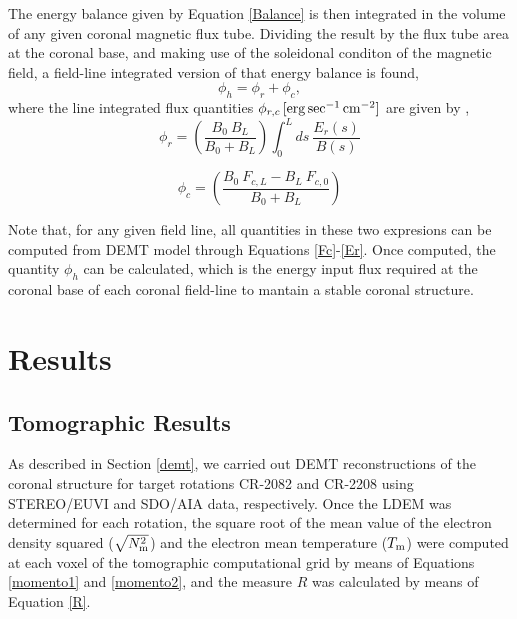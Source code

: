 \documentclass[namedreferences]{solarphysics}
\newcommand{\Tm}{T_{\rm m}}
\newcommand{\Nsqm}{N^2_{{\rm m}}}
\newcommand{\sqravgN}{\sqrt{\Nsqm}}
\begin{document}
\begin{article}
{The energy balance given by Equation \ref{Balance} is then integrated in the volume of any given coronal magnetic flux tube. Dividing the result by the flux tube area at the coronal base, and making use of the soleidonal conditon of the magnetic field, a field-line integrated version of that energy balance is found,
\begin{equation}\label{FluxBalance}
\phi_h = \phi_r + \phi_c,
\end{equation}
\noindent
where the line integrated flux quantities $\phi_{r,c}\,[\rm{erg\,sec^{-1}\,cm^{-2}}]$ are given by \citep{maccormack_2017},} \\


\begin{equation}\label{phi_r}
\phi_r = \left( \frac{B_0 \ B_L}{B_0 + B_L} \right) \int_{0}^{L} ds \ \frac{E_r(s)}{B(s)}
\end{equation}

\begin{equation}\label{phi_c}
\phi_c = \left( \frac{B_0 \ F_{c,L} - B_L \ F_{c,0}}{B_0 + B_L} \right) 
\end{equation}

{Note that, for any given field line, all quantities in these two expresions can be computed {from DEMT model} through Equations \ref{Fc}-\ref{Er}. Once computed, the quantity $\phi_h$ can be calculated, which is the energy input flux required at the coronal base of each coronal field-line to mantain a stable coronal structure.}

\section{Results}\label{resu} 

\subsection{Tomographic Results}\label{demt_res} 

{As described in Section \ref{demt}, we carried out DEMT reconstructions of the coronal structure for target rotations CR-2082 and CR-2208 using STEREO/EUVI and SDO/AIA data, respectively.} {Once the LDEM was determined for each rotation, the square root of the mean value of the electron density squared ($\sqravgN$) and the electron mean temperature ($\Tm$) were computed at each voxel of the tomographic computational grid by means of Equations \ref{momento1} and \ref{momento2}{, and the measure $R$ was calculated by means of Equation \ref{R}.}} 


\end{article}
\end{document}
